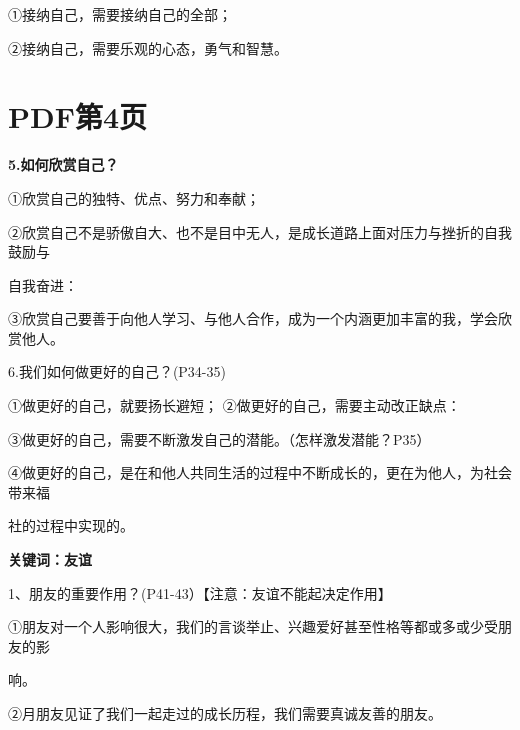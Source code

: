\documentclass[lang=cn,11pt]{elegantbook}
\newcommand{\daofasym}[1]{{\daofasymbolfont #1}}
\newcommand{\daofasym}[1]{#1}
\begin{document}
\daofasym{①}接纳自己，需要接纳自己的全部；\par

\daofasym{②}接纳自己，需要乐观的心态，勇气和智慧。\par


\section*{PDF第4页}

\textbf{5.如何欣赏自己？}\par

\daofasym{①}欣赏自己的独特、优点、努力和奉献；\par

\daofasym{②}欣赏自己不是骄傲自大、也不是目中无人，是成长道路上面对压力与挫折的自我鼓励与\par

自我奋进：\par

\daofasym{③}欣赏自己要善于向他人学习、与他人合作，成为一个内涵更加丰富的我，学会欣赏他人。\par

6.我们如何做更好的自己？(P34-35)\par

\daofasym{①}做更好的自己，就要扬长避短； \daofasym{②}做更好的自己，需要主动改正缺点：\par

\daofasym{③}做更好的自己，需要不断激发自己的潜能。（怎样激发潜能？P35）\par

\daofasym{④}做更好的自己，是在和他人共同生活的过程中不断成长的，更在为他人，为社会带来福\par

社的过程中实现的。\par

\textbf{关键词：友谊}\par

1、朋友的重要作用？(P41-43）【注意：友谊不能起决定作用】\par

\daofasym{①}朋友对一个人影响很大，我们的言谈举止、兴趣爱好甚至性格等都或多或少受朋友的影\par

响。\par

\daofasym{②}月朋友见证了我们一起走过的成长历程，我们需要真诚友善的朋友。\par
\end{document}
